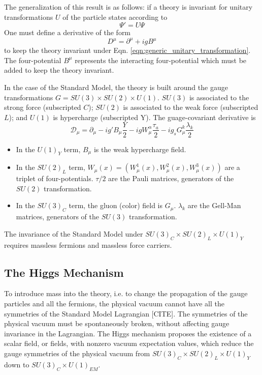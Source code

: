 \documentclass{article}
\begin{document}
The generalization of this result is as follows: if a theory is invariant for unitary transformations $U$ of the particle states according to 
\begin{equation}
    \Psi' = U\Psi
\label{eqn:generic_unitary_transformation}
\end{equation}
One must define a derivative of the form
\begin{equation}
    D^\mu = \partial^\mu + ig B^\mu
\end{equation}
to keep the theory invariant under Eqn. \ref{eqn:generic_unitary_transformation}. The four-potential $B^\mu$ represents the interacting four-potential which must be added to keep the theory invariant.

In the case of the Standard Model, the theory is built around the gauge transformations $G = SU(3) \times SU(2) \times U(1)$. $SU(3)$ is associated to the strong force (subscripted $C$); $SU(2)$ is associated to the weak force (subscripted $L$); and $U(1)$ is hypercharge (subscripted Y). The guage-covariant derivative  is 
\begin{equation}
    \mathcal{D}_\mu = \partial_\mu - ig' B_\mu \frac{Y}{2} - ig W_{\mu}^{\alpha} \frac{\tau_a}{2} - ig_s G_\mu^{k} \frac{\lambda_k}{2}
\end{equation}
\begin{itemize}
    \item In the $U(1)_Y$ term, $B_\mu$ is the weak hypercharge field.
    \item In the $SU(2)_L$ term, $W_\mu(x) = (W_\mu^1(x), W_\mu^2(x), W_\mu^3(x))$ are a triplet of four-potentials. $\tau/2$ are the Pauli matrices, generators of the $SU(2)$ transformation.
    \item In the $SU(3)_C$ term, the gluon (color) field is $G_\mu$. $\lambda_k$ are the Gell-Man matrices, generators of the $SU(3)$ transformation.
\end{itemize}   
The invariance of the Standard Model under $SU(3)_C \times SU(2)_L \times U(1)_Y$ requires massless fermions and massless force carriers.  

\subsection{The Higgs Mechanism}
To introduce mass into the theory, i.e. to change the propagation of the gauge particles and all the fermions, the physical vacuum cannot have all the symmetries of the Standard Model Lagrangian [CITE]. The symmetries of the physical vacuum must be spontaneously broken, without affecting gauge invariance in the Lagrangian. The Higgs mechanism proposes the existence of a scalar field, or fields, with nonzero vacuum expectation values, which reduce the gauge symmetries of the physical vacuum from $SU(3)_C \times SU(2)_L \times U(1)_Y$ down to $SU(3)_C \times U(1)_{EM}$.
\end{document}
